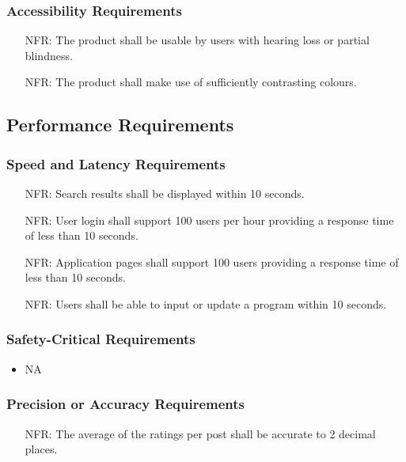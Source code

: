\documentclass[12pt]{article}
\newcounter{nfrnum} %
\begin{document}
\subsubsection{Accessibility Requirements}
\noindent \begin{itemize}
	\item[NFR\refstepcounter{nfrnum}\thenfrnum:]
	The product shall be usable by users with hearing loss or partial blindness.
\end{itemize}
\noindent \begin{itemize}
	\item[NFR\refstepcounter{nfrnum}\thenfrnum:]
	The product shall make use of sufficiently contrasting colours.
\end{itemize}
\subsection{Performance Requirements}
  \subsubsection{Speed and Latency Requirements}
    \noindent\begin{itemize}
      \item[NFR\refstepcounter{nfrnum}\thenfrnum:] 
        Search results shall be displayed within 10 seconds.
      \item[NFR\refstepcounter{nfrnum}\thenfrnum:] 
        User login shall support 100 users per hour providing a response time of less than 10 seconds.
      \item[NFR\refstepcounter{nfrnum}\thenfrnum:] 
        Application pages shall support 100 users providing a response time of less than 10 seconds.
      \item[NFR\refstepcounter{nfrnum}\thenfrnum:] 
        Users shall be able to input or update a program within 10 seconds.
    \end{itemize}
  \subsubsection{Safety-Critical Requirements}
    \noindent\begin{itemize}
      \item NA
    \end{itemize}
  \subsubsection{Precision or Accuracy Requirements}
    \noindent\begin{itemize}
      \item[NFR\refstepcounter{nfrnum}\thenfrnum:] 
        The average of the ratings per post shall be accurate to 2 decimal places.
    \end{itemize}
\end{document}
